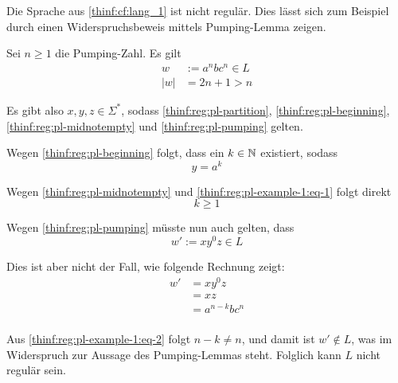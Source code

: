 \begin{example}
	\label{thinf:reg:pl-example-1}
	Die Sprache aus \eqref{thinf:cf:lang_1} ist nicht regulär. Dies lässt
	sich zum Beispiel durch einen Widerspruchsbeweis mittels Pumping-Lemma
	zeigen.

	Sei $n \geq 1$ die Pumping-Zahl. Es gilt
	\begin{align*}
		w & := a^n b c^n \in L \\
		|w| & = 2n + 1 > n
	\end{align*}

	Es gibt also $x,y,z \in \Sigma^*$, sodass
	\eqref{thinf:reg:pl-partition}, \eqref{thinf:reg:pl-beginning},
	\eqref{thinf:reg:pl-midnotempty} und \eqref{thinf:reg:pl-pumping}
	gelten.

	Wegen \eqref{thinf:reg:pl-beginning} folgt, dass ein $k \in \mathbb{N}$ existiert, sodass
	\begin{equation}
		\label{thinf:reg:pl-example-1:eq-1}
		y = a^k
	\end{equation}

	Wegen \eqref{thinf:reg:pl-midnotempty} und
	\eqref{thinf:reg:pl-example-1:eq-1} folgt direkt
	\begin{equation}
		\label{thinf:reg:pl-example-1:eq-2}
		k \geq 1
	\end{equation}

	Wegen \eqref{thinf:reg:pl-pumping} müsste nun auch gelten, dass
	\begin{equation}
		w' := xy^0z \in L
	\end{equation}

	Dies ist aber nicht der Fall, wie folgende Rechnung zeigt:
	\begin{align*}
		w'
		& = xy^0z \\
		& = xz \\
		& = a^{n - k} b c^n \\
	\end{align*}

	Aus \eqref{thinf:reg:pl-example-1:eq-2} folgt $n - k \neq n$, und damit ist $w' \notin L$, was im
	Widerspruch zur Aussage des Pumping-Lemmas steht. Folglich kann $L$ nicht
	regulär sein.
\end{example}
